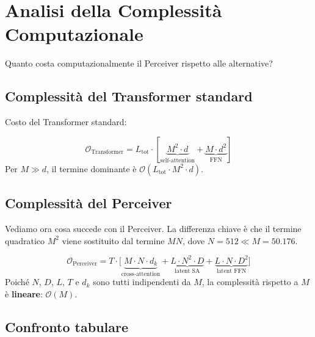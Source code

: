 \documentclass[12pt,a4paper]{article}
\begin{document}
\newpage
\section{Analisi della Complessit\`a Computazionale} \label{sec:complessita}

Quanto costa computazionalmente il Perceiver rispetto alle alternative?

\subsection{Complessit\`a del Transformer standard} \label{sec:compl_transf}

Costo del Transformer standard:

\begin{formulabox}
\[
    \mathcal{O}_{\text{Transformer}} = L_{\text{tot}} \cdot \left[\underbrace{M^2 \cdot d}_{\text{self-attention}} + \underbrace{M \cdot d^2}_{\text{FFN}}\right]
\]
Per $M \gg d$, il termine dominante \`e $\mathcal{O}(L_{\text{tot}} \cdot M^2 \cdot d)$.
\end{formulabox}

\subsection{Complessit\`a del Perceiver} \label{sec:compl_perceiver}

Vediamo ora cosa succede con il Perceiver. La differenza chiave \`e che il termine quadratico $M^2$ viene sostituito dal termine $MN$, dove $N = 512 \ll M = 50.176$.

\begin{formulabox}
\[
    \mathcal{O}_{\text{Perceiver}} = T \cdot \bigg[\underbrace{M \cdot N \cdot d_k}_{\text{cross-attention}} + \underbrace{L \cdot N^2 \cdot D}_{\text{latent SA}} + \underbrace{L \cdot N \cdot D^2}_{\text{latent FFN}}\bigg]
\]
Poich\'e $N$, $D$, $L$, $T$ e $d_k$ sono tutti indipendenti da $M$, la complessit\`a rispetto a $M$ \`e \textbf{lineare}: $\mathcal{O}(M)$.
\end{formulabox}

\subsection{Confronto tabulare} \label{sec:confronto_compl}
\end{document}
